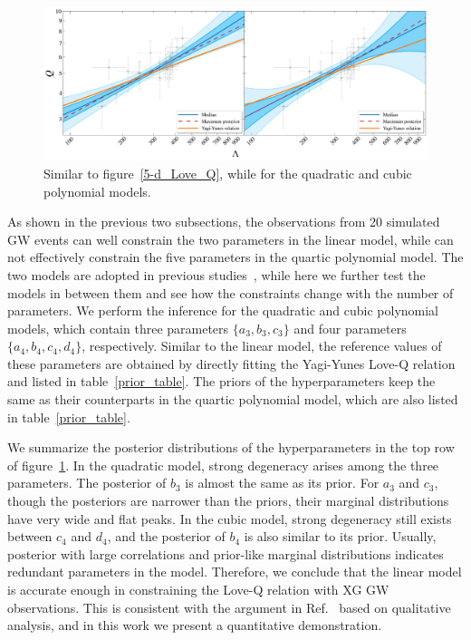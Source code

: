 \documentclass[a4paper,11pt]{article}
\newcommand{\ZW}[1]{\textcolor{magenta}{$\mathcal{ZW}$:~#1}}
\begin{document}
\begin{figure}[t]
    \begin{minipage}[t]{\textwidth}
    \includegraphics[width=\linewidth]{fig_hierarchical_results_APR4_3d.pdf}
    \end{minipage}
    \caption{Similar to figure~\ref{5-d_Love_Q}, while for the quadratic and
    cubic polynomial models.
    }\label{3-d_4-d_Love_Q}
\end{figure}
As shown in the previous two subsections, the observations from 20 simulated GW 
events can well constrain the two parameters in the linear model, while can not 
effectively constrain the five parameters in the quartic polynomial model. The two 
models are adopted in previous studies~\cite{Yagi:2013awa, Samajdar:2020xrd}, 
while here we further test the models in between them and see how the constraints 
change with the number of parameters. We perform the inference for the quadratic 
and cubic polynomial models, which contain three parameters $\{a_3, b_3, c_3\}$ 
and four parameters $\{a_4, b_4, c_4, d_4\}$, respectively. Similar to the linear 
model, the reference values of these parameters are obtained by directly fitting 
the Yagi-Yunes Love-Q relation and listed in table~\ref{prior_table}. The priors of the
hyperparameters keep the same as their counterparts in the quartic polynomial 
model, which are also listed in table~\ref{prior_table}.

We summarize the posterior distributions of the hyperparameters in the top row of 
figure~\ref{3-d_4-d_Love_Q}. In the quadratic model, strong degeneracy arises 
among the three parameters. The posterior of $b_3$ is almost the same as its 
prior. For $a_3$ and $c_3$, though the posteriors are narrower than the priors, 
their marginal distributions have very wide and flat peaks. In the cubic model, 
strong degeneracy still exists between $c_4$ and $d_4$, and the posterior of $b_4$ 
is also similar to its prior. Usually, posterior with large correlations and 
prior-like marginal distributions indicates redundant parameters in the model. 
Therefore, we conclude that the linear model is accurate enough in constraining 
the Love-Q relation with XG GW observations. This is consistent with the argument 
in Ref.~\cite{Samajdar:2020xrd} based on qualitative analysis, and in this work we present a quantitative demonstration. 
\end{document}
